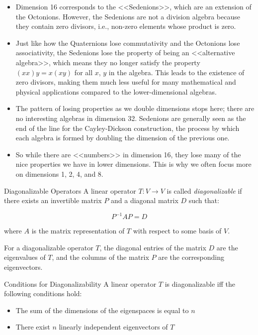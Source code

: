 \documentclass[fullscreen=true, bookmarks=true, hyperref={pdfencoding=unicode}]{beamer}
\begin{document}
\begin{frame}
  \small
  \begin{itemize}
    \item Dimension 16 corresponds to the <<Sedenions>>, which are an extension 
    of the Octonions. However, the Sedenions are not a division algebra 
    because they contain zero divisors, i.e., non-zero elements 
    whose product is zero.
    
    \pause\item
    Just like how the Quaternions lose commutativity and the 
    Octonions lose associativity, the Sedenions lose the property 
    of being an <<alternative algebra>>, which means they no longer 
    satisfy the property $(xx)y = x(xy)$ for all $x$, $y$ in the algebra. 
    This leads to the existence of zero divisors, making them much less 
    useful for many mathematical and physical applications compared to the lower-dimensional algebras.
    
    \pause\item
    The pattern of losing properties as we double dimensions stops here; 
    there are no interesting algebras in dimension 32. 
    Sedenions are generally seen as the end of the line for 
    the Cayley-Dickson construction, the process by which each algebra 
    is formed by doubling the dimension of the previous one.
    
    \pause\item
    So while there are <<numbers>> in dimension 16, 
    they lose many of the nice properties we have in lower dimensions. 
    This is why we often focus more on dimensions 1, 2, 4, and 8.
  \end{itemize}
\end{frame}


\begin{frame}{Diagonalizable Operators}
  A linear operator $T: V \rightarrow V$ is called \emph{diagonalizable} if there exists an invertible matrix $P$ and a diagonal matrix $D$ such that:
  
  \[
  P^{-1} A P = D
  \]
  
  where $A$ is the matrix representation of $T$ with respect to some basis of $V$.
  
  \pause
  For a diagonalizable operator $T$, the diagonal entries of the matrix $D$ 
  are the eigenvalues of $T$, and the columns of the matrix $P$ 
  are the corresponding eigenvectors.

  \pause
  \begin{block}{Conditions for Diagonalizability}
    A linear operator $T$ is diagonalizable iff the following conditions hold:
    
    \begin{itemize}
      \item The sum of the dimensions of the eigenspaces is equal to $n$
      \item There exist $n$ linearly independent eigenvectors of $T$
    \end{itemize}
  \end{block}

\end{frame}
    
\end{document}
